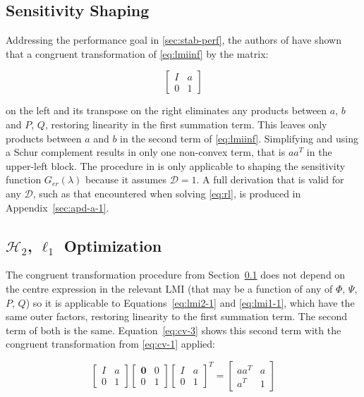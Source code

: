 \subsection{Sensitivity Shaping}
\label{sec:opt-ss}

Addressing the performance goal in \autoref{sec:stab-perf}, the authors of \cite[Th. 1]{Li2014} have shown that a congruent transformation of \autoref{eq:lmiinf} by the matrix:

\begin{equation} \label{eq:cv-1}
	\begin{bmatrix}
		I & a \\
		0 & 1
	\end{bmatrix}
\end{equation}

on the left and its transpose on the right eliminates any products between $a$, $b$ and $P$, $Q$, restoring linearity in the first summation term. This leaves only products between $a$ and $b$ in the second term of \autoref{eq:lmiinf}. Simplifying and using a Schur complement results in only one non-convex term, that is $aa^T$ in the upper-left block. The procedure in \cite{Li2014} is only applicable to shaping the sensitivity function $G_{er}(\lambda)$ because it assumes $\mathcal{D} = 1$. A full derivation that is valid for any $\mathcal{D}$, such as that encountered when solving \autoref{eq:rl}, is produced in Appendix~\ref{sec:apd-a-1}.

\subsection{$\mathcal{H}_2$, $\ell_1$ Optimization}
\label{sec:opt-h2l1}

The congruent transformation procedure from Section~\ref{sec:opt-ss} does not depend on the centre expression in the relevant \gls{LMI} (that may be a function of any of $\Phi$, $\Psi$, $P$, $Q$) so it is applicable to Equations~\ref{eq:lmi2-1} and \ref{eq:lmi1-1}, which have the same outer factors, restoring linearity to the first summation term. The second term of both is the same. Equation~\ref{eq:cv-3} shows this second term with the congruent transformation from \autoref{eq:cv-1} applied:

\begin{equation} \label{eq:cv-3}
	\begin{bmatrix}
		I & a \\
		0 & 1
	\end{bmatrix}
	\begin{bmatrix}
		\mathbf{0} & 0 \\
		0 & 1
	\end{bmatrix}
	\begin{bmatrix}
		I & a \\
		0 & 1
	\end{bmatrix}^T
	= 
	\begin{bmatrix}
		aa^T & a \\
		a^T & 1
	\end{bmatrix}
\end{equation}

